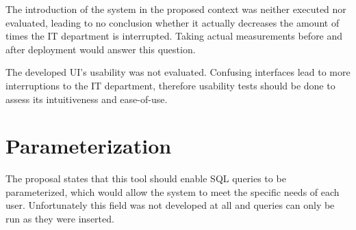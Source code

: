 The introduction of the system in the proposed context was neither executed nor evaluated, leading to no conclusion whether it actually decreases the amount of times the \gls{IT} department is interrupted. Taking actual measurements before and after deployment would answer this question.

The developed \gls{UI}'s usability was not evaluated. Confusing interfaces lead to more interruptions to the \gls{IT} department, therefore usability tests should be done to assess its intuitiveness and ease-of-use.

\section{Parameterization}
The proposal states that this tool should enable \gls{SQL} queries to be parameterized, which would allow the system to meet the specific needs of each user. Unfortunately this field was not developed at all and queries can only be run as they were inserted.

